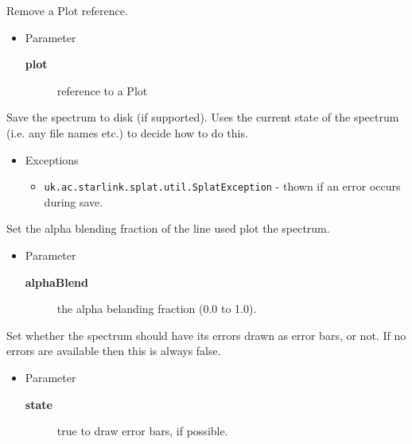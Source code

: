 \begin{desc}Remove a Plot reference.
\begin{itemize}
\item{Parameter
  \begin{description}
   \item[\textbf{plot}]{reference to a Plot}
  \end{description}}
\end{itemize}
\end{desc}

\begin{desc}Save the spectrum to disk (if supported). Uses the current
 state of the spectrum (i.e. any file names etc.) to decide how
 to do this.
\begin{itemize}
\item{{Exceptions}
  \begin{itemize}
   \item{\vspace{-.6ex}\texttt{uk.ac.starlink.splat.util.SplatException} - thown if an error occurs during save.}
  \end{itemize}
}
\end{itemize}
\end{desc}

\begin{desc}Set the alpha blending fraction of the line used plot the spectrum.
\begin{itemize}
\item{Parameter
  \begin{description}
   \item[\textbf{alphaBlend}]{the alpha belanding fraction (0.0 to 1.0).}
  \end{description}}
\end{itemize}
\end{desc}

\begin{desc}Set whether the spectrum should have its errors drawn as error
 bars, or not. If no errors are available then this is always
 false.
\begin{itemize}
\item{Parameter
  \begin{description}
   \item[\textbf{state}]{true to draw error bars, if possible.}
  \end{description}}
\end{itemize}
\end{desc}

